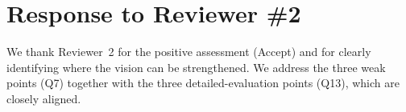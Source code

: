 \section*{Response to Reviewer \#2}
We thank Reviewer~2 for the positive assessment (Accept) and for clearly identifying where the vision can be strengthened. We address the three weak points (Q7) together with the three detailed-evaluation points (Q13), which are closely aligned.




